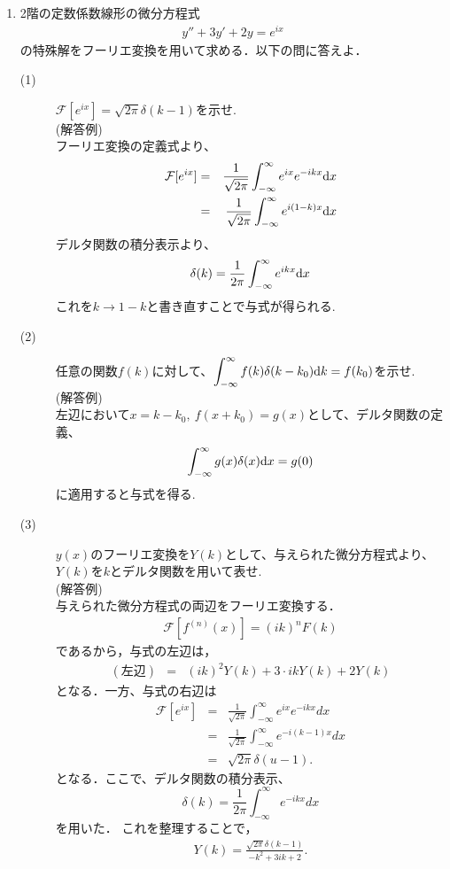 \documentclass[11pt]{jsarticle}
\begin{document}
\begin{enumerate}
\newpage
\item 2階の定数係数線形の微分方程式
\begin{eqnarray*}
y''+3y'+2y=e^{ix}
\end{eqnarray*}
の特殊解をフーリエ変換を用いて求める．以下の問に答えよ．
\begin{description}
\item[(1)] $\mathcal{F}[e^{ix}]=\sqrt{2\pi}\delta (k-1)$を示せ.\\
(解答例)\\
フーリエ変換の定義式より、
\begin{eqnarray*}
\mathcal{F}[e^{ix}] &=& \frac{1}{\sqrt{2\pi}}\int_{-\infty}^{\infty} e^{ix}e^{-ikx}{\rm d}x\\
&=& \frac{1}{\sqrt{2\pi}}\int_{-\infty}^{\infty} e^{i(1-k)x}{\rm d}x
\end{eqnarray*}
デルタ関数の積分表示より、
\[\delta (k)=\frac{1}{2\pi}\int_{-\infty}^{\infty}e^{ikx}{\rm d}x\]
これを$k\rightarrow 1-k$と書き直すことで与式が得られる.\\
\item[(2)] 任意の関数$f(k)$に対して、$\displaystyle{\int_{-\infty}^{\infty} f(k)\delta (k-k_0){\rm d}k=f(k_0)}$を示せ.\\
(解答例)\\
左辺において$x=k-k_0,~f(x+k_0)=g(x)$として、デルタ関数の定義、
\[\int_{-\infty}^{\infty} g(x)\delta (x) {\rm d}x=g(0)\]
に適用すると与式を得る.\\

\item[(3)] $y(x)$のフーリエ変換を$Y(k)$として、与えられた微分方程式より、$Y(k)$を$k$とデルタ関数を用いて表せ.\\
(解答例)\\[8pt]
与えられた微分方程式の両辺をフーリエ変換する．
%
\begin{eqnarray*}
\mathcal{F}\left[f^{(n)}(x) \right]=(ik)^nF(k)
\end{eqnarray*}
%
であるから，与式の左辺は，
\begin{eqnarray*}
(左辺)&=&(ik)^2Y(k)+3\cdot ikY(k)+2Y(k)
\end{eqnarray*}
となる．一方、与式の右辺は
\begin{eqnarray*}
\mathcal{F}\left[e^{ix} \right]&=&\frac{1}{\sqrt{2\pi}}\int_{-\infty}^{\infty} e^{ix}e^{-ikx}dx\\
&=&\frac{1}{\sqrt{2\pi}}\int_{-\infty}^{\infty} e^{-i(k-1)x}dx\\
&=&\sqrt{2\pi}\delta(u-1). \hspace{1cm} 
\end{eqnarray*}
となる．ここで、デルタ関数の積分表示、
\begin{equation*}
\delta(k)=\frac{1}{2\pi}\int_{-\infty}^{\infty}e^{-ikx}dx
\end{equation*}
を用いた．
%
これを整理することで，
%
\begin{eqnarray*}
Y(k)=\frac{\sqrt{2\pi}\delta(k-1)}{-k^2+3ik+2}.\\
\end{eqnarray*}


\end{description}
\end{enumerate}
\end{document}
